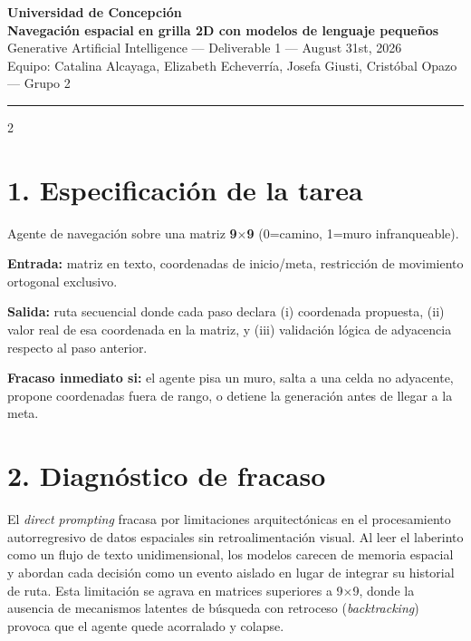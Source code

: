 \documentclass[9pt]{extarticle}
\begin{document}
\begin{center}
{\color{ucblue}\Large\bfseries Universidad de Concepción}\\[2pt]
{\bfseries\large Navegación espacial en grilla 2D con modelos de lenguaje pequeños}\\[2pt]
{\small Generative Artificial Intelligence --- Deliverable 1 --- August 31st, 2026}\\[2pt]
{\small Equipo: Catalina Alcayaga, Elizabeth Echeverría, Josefa Giusti, Cristóbal Opazo --- Grupo 2}
\end{center}

\vspace{2pt}
\hrule
\vspace{3pt}

\begin{multicols}{2}

\section*{1. Especificación de la tarea}
Agente de navegación sobre una matriz \textbf{9$\times$9} (0=camino, 1=muro infranqueable).

\textbf{Entrada:} matriz en texto, coordenadas de inicio/meta, restricción de movimiento ortogonal exclusivo.

\textbf{Salida:} ruta secuencial donde cada paso declara (i) coordenada propuesta, (ii) valor real de esa coordenada en la matriz, y (iii) validación lógica de adyacencia respecto al paso anterior.

\textbf{Fracaso inmediato si:} el agente pisa un muro, salta a una celda no adyacente, propone coordenadas fuera de rango, o detiene la generación antes de llegar a la meta.

\section*{2. Diagnóstico de fracaso}
El \emph{direct prompting} fracasa por limitaciones arquitectónicas en el procesamiento autorregresivo de datos espaciales sin retroalimentación visual. Al leer el laberinto como un flujo de texto unidimensional, los modelos carecen de memoria espacial y abordan cada decisión como un evento aislado en lugar de integrar su historial de ruta. Esta limitación se agrava en matrices superiores a 9$\times$9, donde la ausencia de mecanismos latentes de búsqueda con retroceso (\emph{backtracking}) provoca que el agente quede acorralado y colapse.


\end{multicols}
\end{document}
